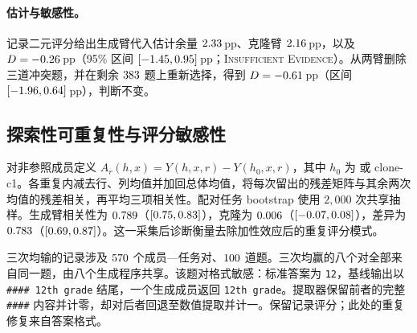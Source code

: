 \paragraph{估计与敏感性。}
记录二元评分给出生成臂代入估计余量 $2.33$\,pp、克隆臂 $2.16$\,pp，以及 $D=-0.26$\,pp（95\% 区间 $[-1.45, 0.95]$\,pp；\textsc{Insufficient Evidence}）。从两臂删除三道冲突题，并在剩余 $383$ 题上重新选择，得到 $D=-0.61$\,pp（区间 $[-1.96, 0.64]$\,pp），判断不变。

\subsection{探索性可重复性与评分敏感性}\label{app:repeatability}
对非参照成员定义 $A_r(h,x)=Y(h,x,r)-Y(h_0,x,r)$，其中 $h_0$ 为 \bare{} 或 clone-c1。各重复内减去行、列均值并加回总体均值，将每次留出的残差矩阵与其余两次均值的残差相关，再平均三项相关性。配对任务 bootstrap 使用 $2{,}000$ 次共享抽样。生成臂相关性为 $0.789$（$[0.75, 0.83]$），克隆为 $0.006$（$[-0.07, 0.08]$），差异为 $0.783$（$[0.69, 0.87]$）。这一采集后诊断衡量去除加性效应后的重复评分模式。

三次均输的记录涉及 $570$ 个成员—任务对、$100$ 道题。三次均赢的八个对全部来自同一题，由八个生成程序共享。该题对格式敏感：标准答案为 \texttt{12}，基线输出以 \texttt{\#\#\#\# 12th grade} 结尾，一个生成成员返回 \texttt{12th grade}。提取器保留前者的完整 \texttt{\#\#\#\#} 内容并计零，却对后者回退至数值提取并计一。保留记录评分；此处的重复修复来自答案格式。
\FloatBarrier
